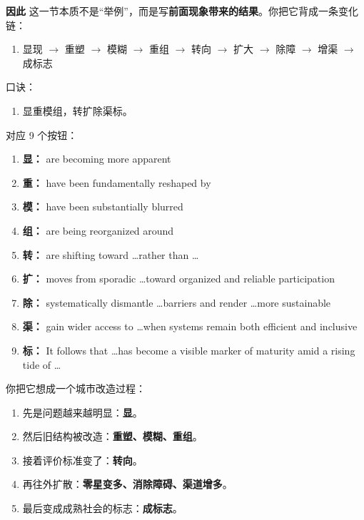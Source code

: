 ﻿\documentclass[lang=cn,11pt]{elegantbook}
\begin{document}
\begin{note}
\textbf{因此} 这一节本质不是“举例”，而是写\textbf{前面现象带来的结果}。你把它背成一条变化链：

\begin{enumerate}
  \item 显现 $\to$ 重塑 $\to$ 模糊 $\to$ 重组 $\to$ 转向 $\to$ 扩大 $\to$ 除障 $\to$ 增渠 $\to$ 成标志
\end{enumerate}

口诀：

\begin{enumerate}
  \item 显重模组，转扩除渠标。
\end{enumerate}

对应 9 个按钮：

\begin{enumerate}
  \item \textbf{显：} are becoming more apparent
  \item \textbf{重：} have been fundamentally reshaped by
  \item \textbf{模：} have been substantially blurred
  \item \textbf{组：} are being reorganized around
  \item \textbf{转：} are shifting toward \ldots rather than \ldots
  \item \textbf{扩：} moves from sporadic \ldots toward organized and reliable participation
  \item \textbf{除：} systematically dismantle \ldots barriers and render \ldots more sustainable
  \item \textbf{渠：} gain wider access to \ldots when systems remain both efficient and inclusive
  \item \textbf{标：} It follows that \ldots has become a visible marker of maturity amid a rising tide of \ldots
\end{enumerate}

你把它想成一个城市改造过程：

\begin{enumerate}
  \item 先是问题越来越明显：\textbf{显}。
  \item 然后旧结构被改造：\textbf{重塑、模糊、重组}。
  \item 接着评价标准变了：\textbf{转向}。
  \item 再往外扩散：\textbf{零星变多、消除障碍、渠道增多}。
  \item 最后变成成熟社会的标志：\textbf{成标志}。
\end{enumerate}


\end{note}
\end{document}

